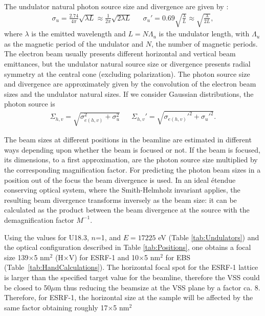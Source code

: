 \documentclass{iucr}              %
\newcommand{\inred}[1]{{\color{red}#1}}
\begin{document}
The undulator natural photon source size and divergence are given by \cite{elleaume}:
\begin{align}
    \label{eq:photon small sigmas}
    \sigma_u=\frac{2.74}{4\pi}\sqrt{\lambda L}\approx \frac{1}{2  \pi}\sqrt{2 \lambda L}  && \sigma_u' = 0.69\sqrt{\frac{\lambda}{L}}\approx \sqrt{\frac{\lambda}{2 L}},
\end{align}
where $\lambda$ is the emitted wavelength and $L=N\Lambda_u$ is the undulator length, with $\Lambda_u$ as the magnetic period of the undulator and $N$, the number of magnetic periods. The electron beam usually presents different horizontal and vertical beam emittances, but the undulator natural source size or divergence presents radial symmetry at the central cone (excluding polarization). The photon source size and divergence are approximately given by the convolution of the electron beam sizes and the undulator natural sizes. If we consider Gaussian distributions, the photon source is
\begin{align}
\label{eq:photon big sigmas}
\Sigma_{h,v}=\sqrt{\sigma_{e(h,v)}^2 + \sigma_u^2} && \Sigma_{h,v}'=\sqrt{\sigma_{e(h,v)}'^2 + \sigma_u'^2}.
\end{align}

The beam sizes at different positions in the beamline are estimated in different ways depending upon whether the beam is focused or not. If the beam is focused, its dimensions, to a first approximation, are the photon source size multiplied by the corresponding magnification factor. For predicting the photon beam sizes in a position out of the focus the beam divergence is used. In an ideal {\'{e}}tendue conserving optical system, where the Smith-Helmholz invariant applies, the resulting beam divergence transforms inversely as the beam size: it can be calculated as the product between the beam divergence at the source with the demagnification factor $M^{-1}$.

Using the values for U18.3, $n$=1, and  $E=17225$ eV (Table \ref{tab:Undulators}) and the optical configuration described in Table \ref{tab:Positions}, one obtains a focal size 139$\times$5 nm$^2$ (H$\times$V) for ESRF-1 and 10$\times$5 nm$^2$ for EBS (Table~\ref{tab:HandCalculations}). The horizontal focal spot for the ESRF-1 lattice is larger than the specified target value for the beamline, therefore the VSS could be closed to 50$\mu$m thus reducing the beamsize at the VSS plane by a factor ca. 8.
Therefore, for ESRF-1, the horizontal size at the sample will be affected by the same factor obtaining roughly 17$\times$5 nm$^2$
\end{document}
